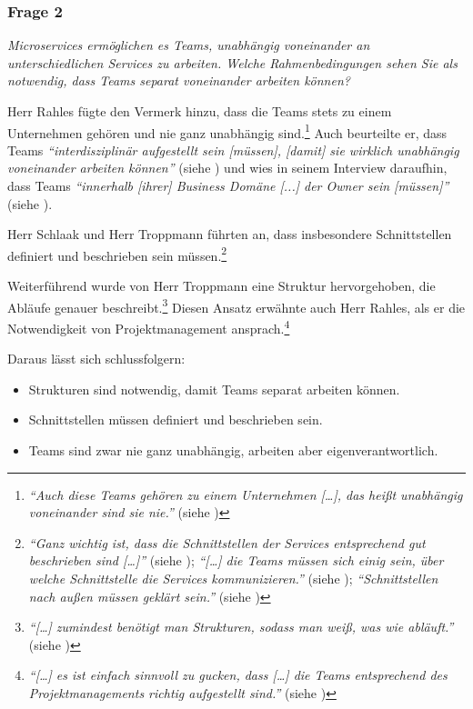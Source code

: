 \subsubsection{Frage 2}
\label{sec:frage2}

\textit{Microservices ermöglichen es Teams, unabhängig voneinander an unterschiedlichen Services zu arbeiten. Welche Rahmenbedingungen sehen Sie als notwendig, dass Teams separat voneinander arbeiten können?}

Herr Rahles fügte den Vermerk hinzu, dass die Teams stets zu einem Unternehmen gehören und nie ganz unabhängig sind.\footnote{
\textit{\enquote{Auch diese Teams gehören zu einem Unternehmen […], das heißt unabhängig voneinander sind sie nie.}} (siehe )
}
Auch beurteilte er, dass Teams \textit{\enquote{interdisziplinär aufgestellt sein [müssen], [damit] sie wirklich unabhängig voneinander arbeiten können}} (siehe ) und wies in seinem Interview daraufhin, dass Teams \textit{\enquote{innerhalb [ihrer] Business Domäne [...] der Owner sein [müssen]}} (siehe ).

Herr Schlaak und Herr Troppmann führten an, dass insbesondere Schnittstellen definiert und beschrieben sein müssen.\footnote{
\textit{\enquote{Ganz wichtig ist, dass die Schnittstellen der Services entsprechend gut beschrieben sind […]}} (siehe ); \textit{\enquote{[…] die Teams müssen sich einig sein, über welche Schnittstelle die Services kommunizieren.}} (siehe ); \textit{\enquote{Schnittstellen nach außen müssen geklärt sein.}} (siehe )
}

Weiterführend wurde von Herr Troppmann eine Struktur hervorgehoben, die Abläufe genauer beschreibt.\footnote{
\textit{\enquote{[…] zumindest benötigt man Strukturen, sodass man weiß, was wie abläuft.}} (siehe )
} Diesen Ansatz erwähnte auch Herr Rahles, als er die Notwendigkeit von Projektmanagement ansprach.\footnote{
\textit{\enquote{[…] es ist einfach sinnvoll zu gucken, dass […] die Teams entsprechend des Projektmanagements richtig aufgestellt sind.}} (siehe )
}

\label{sec:eigenverantwortlich} \label{sec:schnittstelle}
Daraus lässt sich schlussfolgern:
\begin{itemize}
	\item  Strukturen sind notwendig, damit Teams separat arbeiten können.
	\item Schnittstellen müssen definiert und beschrieben sein.
	\item Teams sind zwar nie ganz unabhängig, arbeiten aber eigenverantwortlich.
\end{itemize}

